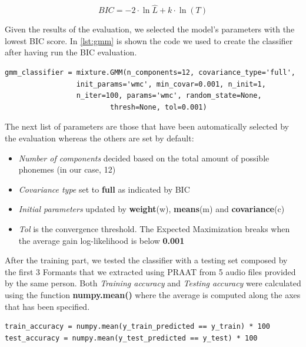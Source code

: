 \begin{equation}
\label{eq:bic}
	 BIC = -2 \cdot \ln{\hat L} + k \cdot \ln(T)
\end{equation}

\noindent Given the results of the evaluation, we selected the model's parameters with the lowest BIC score. In \ref{lst:gmm} is shown the code we used to create the classifier after having run the BIC evaluation.

\begin{lstlisting}[caption={Parameters of GMM classifier},label={lst:gmm}, style=BashInputStyle]
gmm_classifier = mixture.GMM(n_components=12, covariance_type='full',
			     init_params='wmc', min_covar=0.001, n_init=1,
			     n_iter=100, params='wmc', random_state=None,
	                     thresh=None, tol=0.001)
\end{lstlisting}

\clearpage

\noindent The next list of parameters are those that have been automatically selected by the evaluation whereas the others are set by default:

\begin{itemize}
	\item \textit{Number of components} decided based on the total amount of possible phonemes (in our case, 12)
	\item \textit{Covariance type} set to \textbf{full} as indicated by BIC
	\item \textit{Initial parameters} updated by \textbf{weight}(w), \textbf{means}(m) and \textbf{covariance}(c)
	\item \textit{Tol} is the convergence threshold. The Expected Maximization breaks when the average gain log-likelihood is below \textbf{0.001}
\end{itemize}

\noindent After the training part, we tested the classifier with a testing set composed by the first 3 Formants that we extracted using PRAAT from 5 audio files provided by the same person. Both \textit{Training accuracy} and \textit{Testing accuracy} were calculated using the function \textbf{numpy.mean()} where the average is computed along the axes that has been specified.

\begin{lstlisting}[caption={Code for accuracy estimation of training and testing set},label={lst:accuracy}, style=BashInputStyle]
train_accuracy = numpy.mean(y_train_predicted == y_train) * 100
test_accuracy = numpy.mean(y_test_predicted == y_test) * 100
\end{lstlisting}

